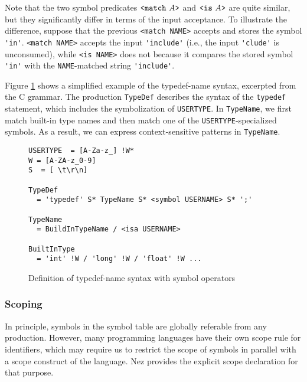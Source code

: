 \documentclass[preprint]{sigplanconf}
\begin{document}
Note that the two symbol predicates {\small $\verb|<match|~A \verb|>|$} and {\small $\verb|<is|~A \verb|>|$} are quite similar, but they significantly differ in terms of the input acceptance.
To illustrate the difference, suppose that the previous {\small \verb|<match NAME>|} accepts and stores the symbol \verb|'in'|. {\small \verb|<match NAME>|} accepts the input \verb|'include'| (i.e., the input \verb|'clude'| is unconsumed), while {\small \verb|<is NAME>|} does not because it compares the stored symbol \verb|'in'| with the {\tt NAME}-matched string \verb|'include'|. 

Figure \ref{fig:typedef} shows a simplified example of the typedef-name syntax, excerpted from the C grammar. 
The production {\tt TypeDef} describes the syntax of the {\tt typedef} statement, which includes the symbolization of {\tt USERTYPE}. In {\tt TypeName}, we first match built-in type names and then match one of the {\tt USERTYPE}-specialized symbols. As a result, we can express context-sensitive patterns in {\tt TypeName}.

\begin{figure}[tb]

{\small 
\begin{framed}
\begin{verbatim}
USERTYPE  = [A-Za-z_] !W*
W = [A-ZA-z_0-9]
S  = [ \t\r\n]
  
TypeDef  
  = 'typedef' S* TypeName S* <symbol USERNAME> S* ';'

TypeName 
  = BuildInTypeName / <isa USERNAME>

BuiltInType
  = 'int' !W / 'long' !W / 'float' !W ...

\end{verbatim} 
\end{framed}
}
\caption{Definition of typedef-name syntax with symbol operators}
\label{fig:typedef}

\end{figure}

\subsubsection{Scoping}

In principle, symbols in the symbol table are globally referable from any production. However, many programming languages have their own scope rule for identifiers, which may require us to restrict the scope of symbols in parallel with a scope construct of the language.  Nez provides the explicit scope declaration for that purpose. 
\end{document}
